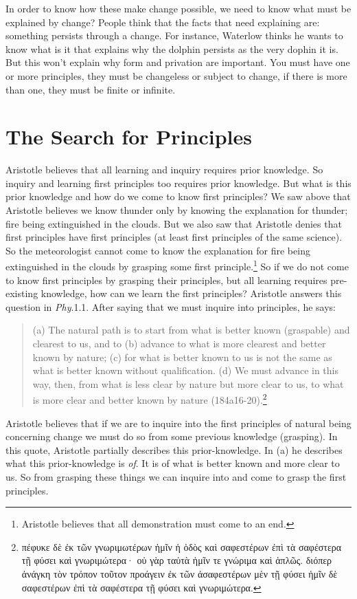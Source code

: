 \documentclass[10pt, oneside]{book}
\newcommand{\greek}[1]{{\selectlanguage{polutonikogreek}#1}}
\begin{document}
In order to know how these make change possible, we need to know what must be explained by change? People think that the facts that need explaining are: something persists through a change. For instance, Waterlow thinks he wants to know what is it that explains why the dolphin persists as the very dophin it is. But this won't explain why form and privation are important. You must have one or more principles, they must be changeless or subject to change, if there is more than one, they must be finite or infinite.


\section{The Search for Principles}

Aristotle believes that all learning and inquiry requires prior knowledge. So inquiry and learning first principles too requires prior knowledge. But what is this prior knowledge and how do we come to know first principles? We saw above that Aristotle believes we know thunder only by knowing the explanation for thunder; fire being extinguished in the clouds. But we also saw that Aristotle denies that first principles have first principles (at least first principles of the same science). So the meteorologist cannot come to know the explanation for fire being extinguished in the clouds by grasping some first principle.\footnote{Aristotle believes that all demonstration must come to an end.} So if we do not come to know first principles by grasping their principles, but all learning requires pre-existing knowledge, how can we learn the first principles?  Aristotle answers this question in \emph{Phy}.1.1. After saying that we must inquire into principles, he says:

\begin{quote}
(a) The natural path is to start from what is better known (graspable) and clearest to us, and to (b) advance to what is more clearest and better known by nature; (c) for what is better known to us is not the same as what is better known without qualification. (d) We must advance in this way, then, from what is less clear by nature but more clear to us, to what is more clear and better known by nature (184a16-20).\footnote{\greek{πέφυκε δὲ ἐκ τῶν γνωριμωτέρων ἡμῖν ἡ ὁδὸς καὶ σαφεστέρων ἐπὶ τὰ σαφέστερα τῇ φύσει καὶ γνωριμώτερα· οὐ γὰρ ταὐτὰ ἡμῖν τε γνώριμα καὶ ἁπλῶς. διόπερ ἀνάγκη τὸν τρόπον τοῦτον προάγειν ἐκ τῶν ἀσαφεστέρων μὲν
τῇ φύσει ἡμῖν δὲ σαφεστέρων ἐπὶ τὰ σαφέστερα τῇ φύσει καὶ γνωριμώτερα.}}
\end{quote}
%
Aristotle believes that if we are to inquire into the first principles of natural being concerning change we must do so from some previous knowledge (grasping). In this quote, Aristotle partially describes this prior-knowledge. In (a) he describes what this prior-knowledge is \emph{of}. It is of what is better known and more clear to us. So from grasping these things we can inquire into and come to grasp the first principles. 
\end{document}
